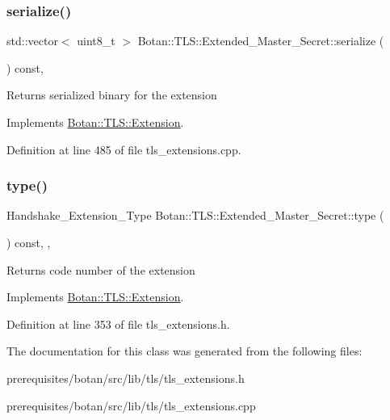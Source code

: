 \subsubsection{\texorpdfstring{serialize()}{serialize()}}
{\footnotesize\ttfamily std\+::vector$<$ uint8\+\_\+t $>$ Botan\+::\+T\+L\+S\+::\+Extended\+\_\+\+Master\+\_\+\+Secret\+::serialize (\begin{DoxyParamCaption}{ }\end{DoxyParamCaption}) const\hspace{0.3cm}{\ttfamily [override]}, {\ttfamily [virtual]}}

\begin{DoxyReturn}{Returns}
serialized binary for the extension 
\end{DoxyReturn}


Implements \mbox{\hyperlink{class_botan_1_1_t_l_s_1_1_extension_a56788726ad2526db54e5a26039cb69db}{Botan\+::\+T\+L\+S\+::\+Extension}}.



Definition at line 485 of file tls\+\_\+extensions.\+cpp.

\mbox{\label{class_botan_1_1_t_l_s_1_1_extended___master___secret_a4e0c181be783e0c301c286ffacd682ef}} 
\subsubsection{\texorpdfstring{type()}{type()}}
{\footnotesize\ttfamily Handshake\+\_\+\+Extension\+\_\+\+Type Botan\+::\+T\+L\+S\+::\+Extended\+\_\+\+Master\+\_\+\+Secret\+::type (\begin{DoxyParamCaption}{ }\end{DoxyParamCaption}) const\hspace{0.3cm}{\ttfamily [inline]}, {\ttfamily [override]}, {\ttfamily [virtual]}}

\begin{DoxyReturn}{Returns}
code number of the extension 
\end{DoxyReturn}


Implements \mbox{\hyperlink{class_botan_1_1_t_l_s_1_1_extension_ac8819b312ce604453225e7b4f7c373ec}{Botan\+::\+T\+L\+S\+::\+Extension}}.



Definition at line 353 of file tls\+\_\+extensions.\+h.



The documentation for this class was generated from the following files\+:\begin{DoxyCompactItemize}
\item 
prerequisites/botan/src/lib/tls/tls\+\_\+extensions.\+h\item 
prerequisites/botan/src/lib/tls/tls\+\_\+extensions.\+cpp\end{DoxyCompactItemize}
